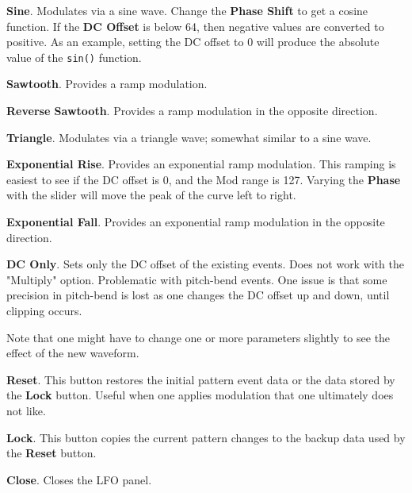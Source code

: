 \begin{enumber}
\begin{enumber}
            \item \textbf{Sine}.
               Modulates via a sine wave.
               Change the \textbf{Phase Shift} to get a cosine function.
               If the \textbf{DC Offset} is below 64, then negative values are
               converted to positive. As an example, setting the DC offset to 0
               will produce the absolute value of the \texttt{sin()} function.
            \item \textbf{Sawtooth}.
               Provides a ramp modulation.
            \item \textbf{Reverse Sawtooth}.
               Provides a ramp modulation in the opposite direction.
            \item \textbf{Triangle}.
               Modulates via a triangle wave; somewhat similar to a sine wave.
            \item \textbf{Exponential Rise}.
               Provides an exponential ramp modulation.
               This ramping is easiest to see if the DC offset is 0,
               and the Mod range is 127.
               Varying the \textbf{Phase} with the slider
               will move the peak of the curve left to right.
            \item \textbf{Exponential Fall}. Provides an exponential
               ramp modulation in the opposite direction.
            \item \textbf{DC Only}. Sets only the DC offset of the
               existing events. Does not work with the "Multiply" option.
               Problematic with pitch-bend events. One issue is that
               some precision in pitch-bend is lost as one changes the DC
               offset up and down, until clipping occurs.
         \end{enumber}
         Note that one might have to change one or more parameters
         slightly to see the effect of the new waveform.
      \item \textbf{Reset}.
         This button restores the initial pattern event data or
         the data stored by the \textbf{Lock} button.
         Useful when one applies modulation that one ultimately does not like.
      \item \textbf{Lock}.
         This button copies the current pattern changes to the backup
         data used by the \textbf{Reset} button.
      \item \textbf{Close}.  Closes the LFO panel.
   \end{enumber}

